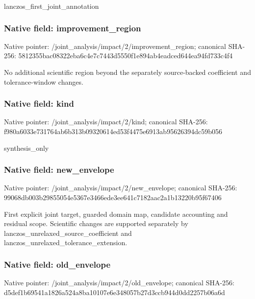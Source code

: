 \documentclass[10pt,a4paper]{article}
\begin{document}
\begingroup\raggedright\sloppy lanczos\_\allowbreak{}first\_\allowbreak{}joint\_\allowbreak{}annotation\par\endgroup

\subsubsection{Native field: improvement\_\allowbreak{}region}
Native pointer: /joint\_\allowbreak{}analysis/impact/2/improvement\_\allowbreak{}region; canonical SHA-256: 5812355bac08322eba6c4e7c7443d5550f1e894ab4eadced644ea94fd733c4f4

\begingroup\raggedright\sloppy No additional scientific region beyond the separately source-backed coefficient and tolerance-window changes.\par\endgroup

\subsubsection{Native field: kind}
Native pointer: /joint\_\allowbreak{}analysis/impact/2/kind; canonical SHA-256: f980a6033e731764ab6b313b09320614ed53f4475e6913ab95626394dc59b056

\begingroup\raggedright\sloppy synthesis\_\allowbreak{}only\par\endgroup

\subsubsection{Native field: new\_\allowbreak{}envelope}
Native pointer: /joint\_\allowbreak{}analysis/impact/2/new\_\allowbreak{}envelope; canonical SHA-256: 99068db003b29855054e5367e3466ede3ee641c7182aac2a1b13220b95f67406

\begingroup\raggedright\sloppy First explicit joint target,\allowbreak{} guarded domain map,\allowbreak{} candidate accounting and residual scope. Scientific changes are supported separately by lanczos\_\allowbreak{}unrelaxed\_\allowbreak{}source\_\allowbreak{}coefficient and lanczos\_\allowbreak{}unrelaxed\_\allowbreak{}tolerance\_\allowbreak{}extension.\par\endgroup

\subsubsection{Native field: old\_\allowbreak{}envelope}
Native pointer: /joint\_\allowbreak{}analysis/impact/2/old\_\allowbreak{}envelope; canonical SHA-256: d5def1b69541a1826a524a8ba10107e6e348057b27d3ccb944d0dd2257b06a6d
\end{document}
